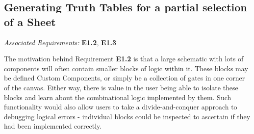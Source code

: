 \newpage %

\subsection{Generating Truth Tables for a partial selection of a Sheet}
\emph{Associated Requirements:} \textbf{E1.2}, \textbf{E1.3}

The motivation behind Requirement \textbf{E1.2} is that a large schematic with lots of components will often contain smaller blocks of logic within it. These blocks may be defined Custom Components, or simply be a collection of gates in one corner of the canvas. Either way, there is value in the user being able to isolate these blocks and learn about the combinational logic implemented by them. Such functionality would also allow users to take a divide-and-conquer approach to debugging logical errors - individual blocks could be inspected to ascertain if they had been implemented correctly. 

